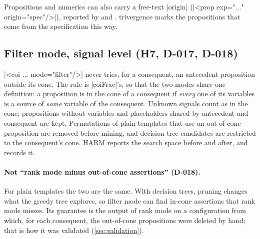 Propositions and numerics can also carry a free-text \code|origin| (\code|<prop exp="..." origin="spec"/>|), reported by  and . trivergence marks the propositions that come from the specification this way.

\subsection{Filter mode, signal level (H7, D-017, D-018)}
\code|<coi ... mode="filter"/>| never tries, for a consequent, an antecedent proposition outside its cone. The rule is \code|coiFrac|'s, so that the two modes share one definition: a proposition is in the cone of a consequent if \emph{every} one of its variables is a source of \emph{some} variable of the consequent. Unknown signals count as in the cone; propositions without variables and placeholders shared by antecedent and consequent are kept. Permutations of plain templates that use an out-of-cone proposition are removed before mining, and decision-tree candidates are restricted to the consequent's cone. HARM reports the search space before and after, and  records it.

\paragraph{Not ``rank mode minus out-of-cone assertions'' (D-018).} For plain templates the two are the same. With decision trees, pruning changes what the greedy tree explores, so filter mode can find in-cone assertions that rank mode misses. Its guarantee is the output of rank mode on a configuration from which, for each consequent, the out-of-cone propositions were deleted by hand; that is how it was validated (\cref{sec:validation}).

